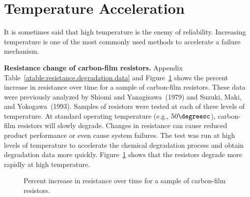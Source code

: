 \section{Temperature Acceleration}
\label{section:temp.acc}
It is sometimes said that high temperature is the enemy of
reliability.
Increasing temperature is one of the most commonly used methods to
accelerate a failure mechanism.  
\begin{example}
\label{example:resistance.degradation.data}
{\bf Resistance change of carbon-film resistors.} Appendix
Table~\ref{atable:resistance.degradation.data} and
Figure~\ref{figure:resistance.degradation.data} shows the percent
increase in resistance over time for a sample of carbon-film
resistors.  These data were previously analyzed by Shiomi and
Yanagisawa~(1979) and Suzuki, Maki, and Yokogawa~(1993).  Samples of
resistors were tested at each of three levels of temperature. At
standard operating temperature (e.g., $50 \degreesc$), carbon-film
resistors will slowly degrade. Changes in resistance can cause 
reduced product performance or even cause system failures.  The
test was run at high levels of temperature to accelerate
the chemical degradation process and obtain degradation data more
quickly.  Figure~\ref{figure:resistance.degradation.data} shows that
the resistors degrade more rapidly at high temperature.
\begin{figure}
\caption{Percent increase in resistance over time for a sample of carbon-film resistors.}
\label{figure:resistance.degradation.data}
\end{figure}
\end{example}



